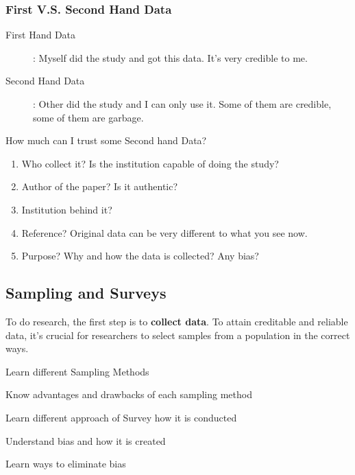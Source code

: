  \subsubsection{First V.S. Second Hand Data}
 \begin{description} 
    \item[First Hand Data]: Myself did the study and got this data. It's very credible to me.
    \item[Second Hand Data]: Other did the study and I can only use it. Some of them are credible, some of them are garbage.
 \end{description} 
 \begin{Question}
    How much can I trust some Second hand Data? 
 \solution \begin{enumerate}
    \item Who collect it? Is the institution capable of doing the study? \item Author of the paper? Is it authentic? 
    \item Institution behind it? 
    \item Reference? Original data can be very different to what you see now. 
    \item Purpose? Why and how the data is collected? Any bias?
\end{enumerate}
 \end{Question}


\vfill
\newpage

\subsection{Sampling and Surveys}
To do research, the first step is to \textbf{collect data}. To attain creditable and reliable data, it's crucial for researchers to select samples from a population in the correct ways.
\\
\begin{objectives}
    \item Learn different Sampling Methods
    \item Know advantages and drawbacks of each sampling method
    \item Learn different approach of Survey how it is conducted
    \item Understand bias and how it is created
    \item Learn ways to eliminate bias
\end{objectives}

